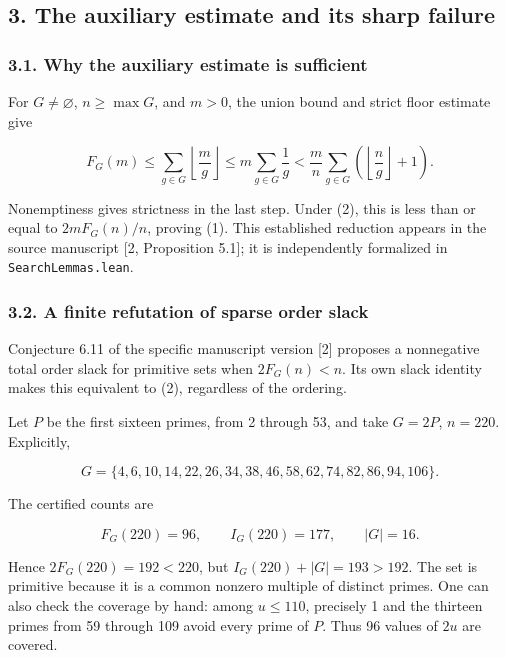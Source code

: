\documentclass[
  11pt,
]{article}
\begin{document}
\hypertarget{the-auxiliary-estimate-and-its-sharp-failure}{%
\subsection{3. The auxiliary estimate and its sharp
failure}\label{the-auxiliary-estimate-and-its-sharp-failure}}

\hypertarget{why-the-auxiliary-estimate-is-sufficient}{%
\subsubsection{3.1. Why the auxiliary estimate is
sufficient}\label{why-the-auxiliary-estimate-is-sufficient}}

For \(G\ne\varnothing\), \(n\ge\max G\), and \(m>0\), the union bound
and strict floor estimate give

\[
F_G(m)\le\sum_{g\in G}\left\lfloor\frac mg\right\rfloor
\le m\sum_{g\in G}\frac1g
<\frac mn\sum_{g\in G}\left(\left\lfloor\frac ng\right\rfloor+1\right).
\]

Nonemptiness gives strictness in the last step. Under (2), this is less
than or equal to \(2mF_G(n)/n\), proving (1). This established reduction
appears in the source manuscript {[}2, Proposition 5.1{]}; it is
independently formalized in \texttt{SearchLemmas.\allowbreak{}lean}.

\hypertarget{a-finite-refutation-of-sparse-order-slack}{%
\subsubsection{3.2. A finite refutation of sparse order
slack}\label{a-finite-refutation-of-sparse-order-slack}}

Conjecture 6.11 of the specific manuscript version {[}2{]} proposes a
nonnegative total order slack for primitive sets when \(2F_G(n)<n\). Its
own slack identity makes this equivalent to (2), regardless of the
ordering.

Let \(P\) be the first sixteen primes, from 2 through 53, and take
\(G=2P\), \(n=220\). Explicitly,

\[
G=\{4,6,10,14,22,26,34,38,46,58,62,74,82,86,94,106\}.
\]

The certified counts are

\[
F_G(220)=96,\qquad I_G(220)=177,\qquad |G|=16.
\]

Hence \(2F_G(220)=192<220\), but \(I_G(220)+|G|=193>192\). The set is
primitive because it is a common nonzero multiple of distinct primes.
One can also check the coverage by hand: among \(u\le110\), precisely 1
and the thirteen primes from 59 through 109 avoid every prime of \(P\).
Thus 96 values of \(2u\) are covered.
\end{document}
